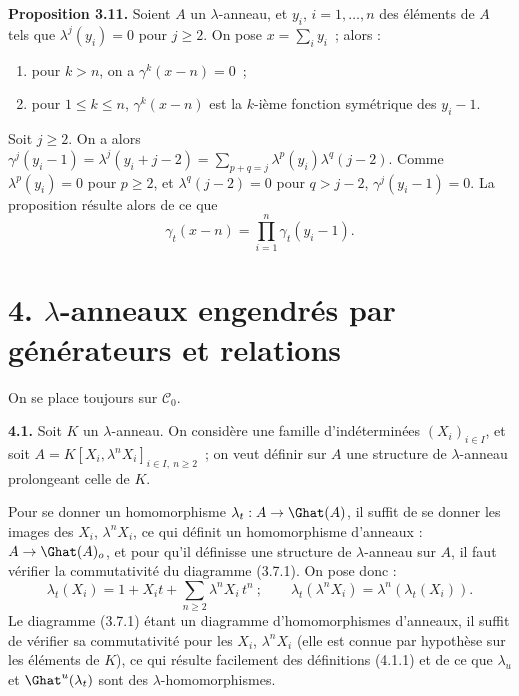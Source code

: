 \textbf{Proposition 3.11.} Soient \(A\) un \(\lambda\)-anneau, et \(y_i\), \(i=1,\dots,n\) des éléments de \(A\) tels que \(\lambda^j(y_i)=0\) pour \(j\ge2\). On pose \(x=\sum_i y_i\)~; alors :
\begin{enumerate}[label=\roman*)]
\item pour \(k>n\), on a \(\gamma^k(x-n)=0\)~;
\item pour \(1\le k\le n\), \(\gamma^k(x-n)\) est la \(k\)-ième fonction symétrique des \(y_i-1\).
\end{enumerate}
Soit \(j\ge2\). On a alors \(\gamma^j(y_i-1)=\lambda^j(y_i+j-2)=\sum_{p+q=j}\lambda^p(y_i)\lambda^q(j-2)\). Comme \(\lambda^p(y_i)=0\) pour \(p\ge2\), et \(\lambda^q(j-2)=0\) pour \(q>j-2\), \(\gamma^j(y_i-1)=0\). La proposition résulte alors de ce que
\[
  \gamma_t(x-n)=\prod_{i=1}^{n}\gamma_t(y_i-1).
\]

\section*{4. \(\lambda\)-anneaux engendrés par générateurs et relations}

On se place toujours sur \(\mathcal C_0\).

\textbf{4.1.} Soit \(K\) un \(\lambda\)-anneau. On considère une famille d'indéterminées \((X_i)_{i\in I}\), et soit \(A=K[X_i,\lambda^n X_i]_{i\in I,\ n\ge2}\)~; on veut définir sur \(A\) une structure de \(\lambda\)-anneau prolongeant celle de \(K\).

Pour se donner un homomorphisme \(\lambda_t:A\to\Ghat(A)\), il suffit de se donner les images des \(X_i\), \(\lambda^n X_i\), ce qui définit un homomorphisme d'anneaux : \(A\to\Ghat(A)_o\), et pour qu'il définisse une structure de \(\lambda\)-anneau sur \(A\), il faut vérifier la commutativité du diagramme (3.7.1). On pose donc :
\begin{equation}\tag{4.1.1}
  \lambda_t(X_i)=1+X_it+\sum_{n\ge2}\lambda^n X_i\,t^n~;
  \qquad
  \lambda_t(\lambda^n X_i)=\lambda^n(\lambda_t(X_i)).
\end{equation}
Le diagramme (3.7.1) étant un diagramme d'homomorphismes d'anneaux, il suffit de vérifier sa commutativité pour les \(X_i\), \(\lambda^n X_i\) (elle est connue par hypothèse sur les éléments de \(K\)), ce qui résulte facilement des définitions (4.1.1) et de ce que \(\lambda_u\) et \(\Ghat^u(\lambda_t)\) sont des \(\lambda\)-homomorphismes.

